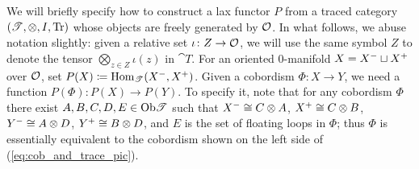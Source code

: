 \documentclass[11pt,oneside,article]{memoir}
\begin{document}
We will briefly specify how to construct a lax functor $P$ from a traced category $(\mathscr{T},\otimes,I,\operatorname{Tr})$ whose objects are freely generated by $\mathcal{O}$. In what follows, we abuse notation slightly: given a relative set $\iota\colon Z\to\mathcal{O}$, we will use the same symbol $Z$ to denote the tensor $\bigotimes_{z\in Z}\iota(z)$ in $\cat{T}$.  For an oriented 0-manifold $X=X^-\sqcup X^+$ over $\mathcal{O}$, set $P(X)\coloneqq\operatorname{Hom}_{\mathscr{T}}(X^-,X^+)$. Given a cobordism $\Phi\colon X\to Y$, we need a function $P(\Phi)\colon P(X)\to P(Y)$. To specify it, note that for any cobordism $\Phi$ there exist $A,B,C,D,E\in\mathrm{Ob}\mathscr{T}$ such that $X^-\cong C\otimes A$, $X^+\cong C\otimes B$, $Y^-\cong A\otimes D$, $Y^+\cong B\otimes D$, and $E$ is the set of floating loops in $\Phi$; thus $\Phi$ is essentially equivalent to the cobordism shown on the left side of (\ref{eq:cob_and_trace_pic}).
\end{document}
